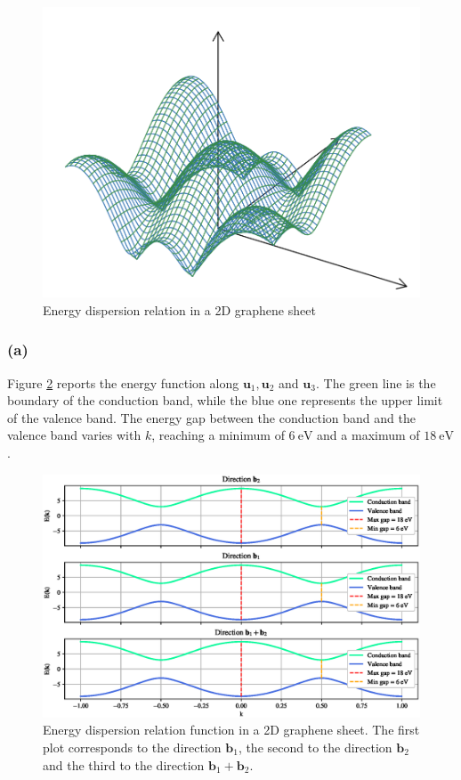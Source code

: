 \documentclass{article}
\newcommand{\ve}[1]{\mathbf{#1}}
\begin{document}
\begin{figure}[h]
    \centering
    \includegraphics[scale=0.4]{energy.png}
    \caption{Energy dispersion relation in a 2D graphene sheet}
    \label{fig:3dplot}
\end{figure}

\subsubsection*{(a)}
Figure \ref{fig:E_k} reports the energy function along $\ve u_1, \ve u_2$ and $\ve u_3$.
The green line is the boundary of the conduction band, while the blue one represents the upper limit of the valence band.
The energy gap between the conduction band and the valence band varies with $k$, reaching a minimum of $\SI{6}{\electronvolt}$ and a maximum of 
$\SI{18}{\electronvolt}$.
\begin{figure}
    \centering 
    \includegraphics[scale=0.7]{Ek.eps}
    \caption{Energy dispersion relation function in a 2D graphene sheet. The first plot 
    corresponds to the direction $\ve b_1$, the second to the direction $\ve b_2$ and the third to the direction $\ve b_1 + \ve b_2$.}
    \label{fig:E_k}
\end{figure}
\end{document}
